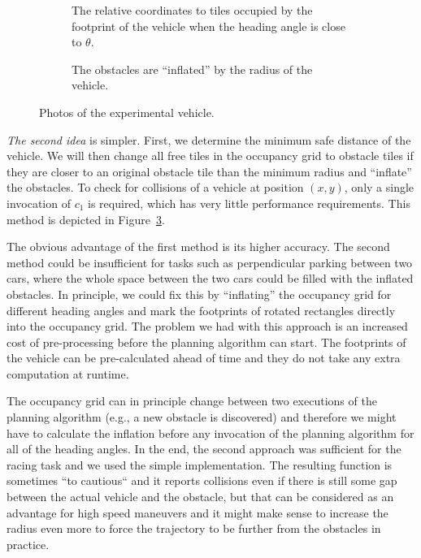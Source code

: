 \begin{figure}[!tbp]%
	\centering
	\begin{subfigure}[t]{0.45\textwidth}
		\caption{The relative coordinates to tiles occupied by the footprint of the vehicle when the heading angle is close to $\theta$.}
		\label{fig:collision_detection_overlap}
	\end{subfigure}
	\hfill
	\begin{subfigure}[t]{0.45\textwidth}
		\caption{The obstacles are ``inflated'' by the radius of the vehicle.}
		\label{fig:collision_detection_inflation}
	\end{subfigure}
	
	\caption{Photos of the experimental vehicle.}
\end{figure}

\textit{The second idea} is simpler. First, we determine the minimum safe distance of the vehicle. We will then change all free tiles in the occupancy grid to obstacle tiles if they are closer to an original obstacle tile than the minimum radius and ``inflate'' the obstacles. To check for collisions of a vehicle at position $(x, y)$, only a single invocation of $c_1$ is required, which has very little performance requirements. This method is depicted in Figure~\ref{fig:collision_detection_inflation}.

The obvious advantage of the first method is its higher accuracy. The second method could be insufficient for tasks such as perpendicular parking between two cars, where the whole space between the two cars could be filled with the inflated obstacles. In principle, we could fix this by ``inflating'' the occupancy grid for different heading angles and mark the footprints of rotated rectangles directly into the occupancy grid. The problem we had with this approach is an increased cost of pre-processing before the planning algorithm can start. The footprints of the vehicle can be pre-calculated ahead of time and they do not take any extra computation at runtime.

The occupancy grid can in principle change between two executions of the planning algorithm (e.g., a new obstacle is discovered) and therefore we might have to calculate the inflation before any invocation of the planning algorithm for all of the heading angles. In the end, the second approach was sufficient for the racing task and we used the simple implementation. The resulting function is sometimes ``to cautious`` and it reports collisions even if there is still some gap between the actual vehicle and the obstacle, but that can be considered as an advantage for high speed maneuvers and it might make sense to increase the radius even more to force the trajectory to be further from the obstacles in practice.

